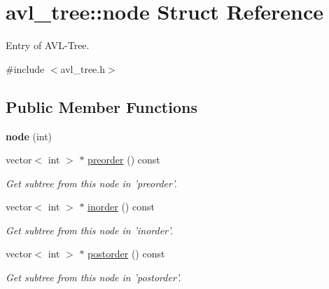 \hypertarget{structavl__tree_1_1node}{\section{avl\-\_\-tree\-:\-:node Struct Reference}
\label{structavl__tree_1_1node}
}


Entry of A\-V\-L-\/\-Tree.  




{\ttfamily \#include $<$avl\-\_\-tree.\-h$>$}

\subsection*{Public Member Functions}
\begin{DoxyCompactItemize}
\item 
\hypertarget{structavl__tree_1_1node_a94e7fa472a575bbcae1e506c4c8b3534}{{\bfseries node} (int)}\label{structavl__tree_1_1node_a94e7fa472a575bbcae1e506c4c8b3534}

\item 
vector$<$ int $>$ $\ast$ \hyperlink{structavl__tree_1_1node_a6932b4c28a69e1adc86f41f74e16cd6e}{preorder} () const 
\begin{DoxyCompactList}\small\item\em Get subtree from this node in 'preorder'. \end{DoxyCompactList}\item 
vector$<$ int $>$ $\ast$ \hyperlink{structavl__tree_1_1node_ac0a51c1a20c50c9c4e0d7037e28afbc2}{inorder} () const 
\begin{DoxyCompactList}\small\item\em Get subtree from this node in 'inorder'. \end{DoxyCompactList}\item 
vector$<$ int $>$ $\ast$ \hyperlink{structavl__tree_1_1node_abe9f3981d8b35f0816657345eeada0a2}{postorder} () const 
\begin{DoxyCompactList}\small\item\em Get subtree from this node in 'postorder'. \end{DoxyCompactList}\end{DoxyCompactItemize}
